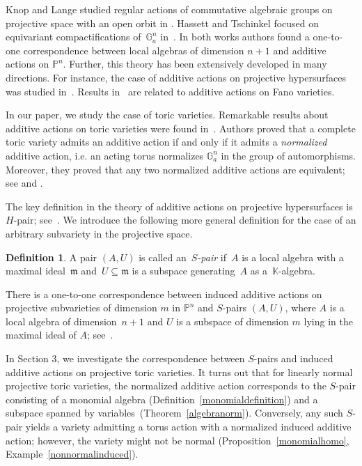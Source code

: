 \documentclass[a4paper,draft,reqno,12pt]{amsart}
\theoremstyle{definition}
\newtheorem{definition}{Definition}
\theoremstyle{definition}
\theoremstyle{remark}
\def\BG{{\mathbb G}}
\def\BK{{\mathbb K}}
\def\BG{{\mathbb G}}
\def\BK{{\mathbb K}}
\def\BP{{\mathbb P}}
\def\mf{\mathfrak{m}}
\begin{document}
Knop and Lange studied regular actions of commutative algebraic groups on projective space with an open orbit in \cite{KL}. Hassett and Tschinkel focused on equivariant compactifications of~$\BG_a^n$ in~\cite{HT}. In both works authors found a one-to-one correspondence between local algebras of dimension $n+1$ and additive actions on $\BP^n$. Further, this theory has been extensively developed in many directions. For instance, the case of additive actions on projective hypersurfaces was studied in~\cite{ABZ,AP,Be,BCS,Sha}. Results in~\cite{BM, UD, UL, ZM} are related to additive actions on Fano varieties.

In our paper, we study the case of toric varieties. Remarkable results about additive actions on toric varieties were found in~\cite{AR}. Authors proved that a complete toric variety admits an additive action if and only if it admits a \emph{normalized} additive action, i.e. an acting torus normalizes $\BG_a^n$ in the group of automorphisms. Moreover, they proved that any two normalized additive actions are equivalent; see \cite[Theorem 2]{AR} and \cite[Theorem 3]{AR}.

The key definition in the theory of additive actions on projective hypersurfaces is $H$-pair; see~\cite[Definition 2.12]{AZ}. We introduce the following more general definition for the case of an arbitrary subvariety in the projective space.
\begin{definition}
    A pair $(A, U)$ is called an~\emph{$S$-pair} if~$A$ is a local algebra with a maximal ideal~$\mf$ and~$U\subseteq\mf$ is a subspace generating~$A$ as a~$\BK$-algebra.
\end{definition}

There is a one-to-one correspondence between induced additive actions on projective subvarieties of dimension $m$ in $\BP^n$ and $S$-pairs $(A, U)$, where $A$ is a local algebra of dimension~$n+1$ and $U$ is a subspace of dimension $m$ lying in the maximal ideal of $A$; see~\cite[Theorem 2.6]{AZ}.

In Section 3, we investigate the correspondence between $S$-pairs and induced additive actions on projective toric varieties. It turns out that for linearly normal projective toric varieties, the normalized additive action corresponds to the $S$-pair consisting of a monomial algebra (Definition~\ref{monomialdefinition}) and a subspace spanned by variables~(Theorem~\ref{algebranorm}). Conversely, any such $S$-pair yields a variety admitting a torus action with a normalized induced additive action; however, the variety might not be normal (Proposition~\ref{monomialhomo}, Example~\ref{nonnormalinduced}). 
\end{document}
